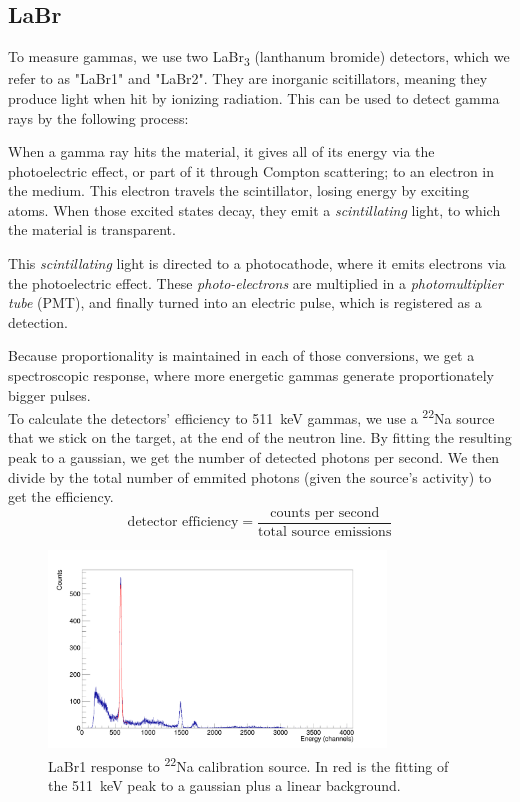 \documentclass[a4paper,12pt]{report}
\newcommand{\Na}{\textsuperscript{22}Na }
\begin{document}
\subsection{LaBr}
To measure gammas, we use two LaBr\textsubscript{3} (lanthanum bromide) detectors, which we refer to as "LaBr1" and "LaBr2".
They are inorganic scitillators, meaning they produce light when hit by ionizing radiation.
This can be used to detect gamma rays by the following process:

When a gamma ray hits the material, it gives all of its energy via the photoelectric effect, or part of it through Compton scattering; to an electron in the medium.
This electron travels the scintillator, losing energy by exciting atoms.
When those excited states decay, they emit a \textit{scintillating} light, to which the material is transparent.

This \textit{scintillating} light is directed to a photocathode, where it emits electrons via the photoelectric effect.
These \textit{photo-electrons} are multiplied in a \textit{photomultiplier tube} (PMT), and finally turned into an electric pulse, which is registered as a detection.

Because proportionality is maintained in each of those conversions, we get a spectroscopic response, where more energetic gammas generate proportionately bigger pulses.
\\

To calculate the detectors' efficiency to \qty{511}{\keV} gammas, we use a \Na source that we stick on the target, at the end of the neutron line.
By fitting the resulting peak to a gaussian, we get the number of detected photons per second.
We then divide by the total number of emmited photons (given the source's activity) to get the efficiency.
\begin{equation}
	\text{detector efficiency} = \frac{\text{counts per second}}{\text{total source emissions}}
\end{equation}

\begin{figure}[H]
	\centering
	\includegraphics[width=0.80\textwidth]{labr_na22_calibration.png}
	\caption{LaBr1 response to \Na calibration source. In red is the fitting of the \qty{511}{\keV} peak to a gaussian plus a linear background.}
	\label{labr_na22_calibration}
\end{figure}
\end{document}
